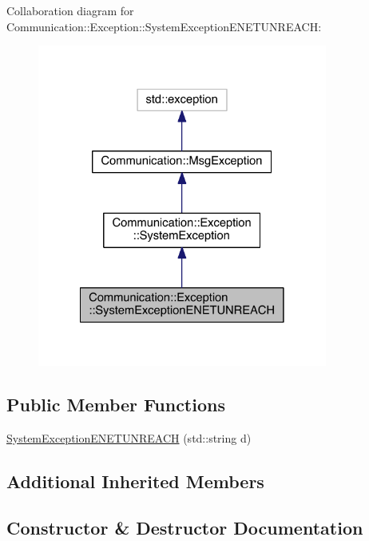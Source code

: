 Collaboration diagram for Communication\+:\+:Exception\+:\+:System\+Exception\+E\+N\+E\+T\+U\+N\+R\+E\+A\+C\+H\+:\nopagebreak
\begin{figure}[H]
\begin{center}
\leavevmode
\includegraphics[width=270pt]{class_communication_1_1_exception_1_1_system_exception_e_n_e_t_u_n_r_e_a_c_h__coll__graph}
\end{center}
\end{figure}
\subsection*{Public Member Functions}
\begin{DoxyCompactItemize}
\item 
\hyperlink{class_communication_1_1_exception_1_1_system_exception_e_n_e_t_u_n_r_e_a_c_h_ac2b13d56dc9ee42efa6cb05c3a5e765e}{System\+Exception\+E\+N\+E\+T\+U\+N\+R\+E\+A\+C\+H} (std\+::string d)
\end{DoxyCompactItemize}
\subsection*{Additional Inherited Members}


\subsection{Constructor \& Destructor Documentation}
\hypertarget{class_communication_1_1_exception_1_1_system_exception_e_n_e_t_u_n_r_e_a_c_h_ac2b13d56dc9ee42efa6cb05c3a5e765e}{}
